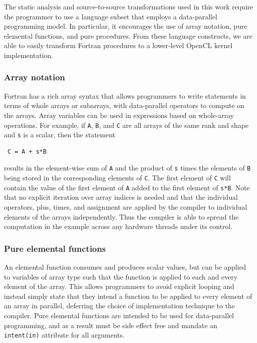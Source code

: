 The static analysis and source-to-source transformations used in this work
require the programmer to use a language subset that employs a data-parallel
programming model.  In particular, it encourages the use of array notation,
pure elemental functions, and pure procedures.  From these language constructs, we
are able to easily transform Fortran procedures to a lower-level OpenCL kernel
implementation.

\subsubsection*{Array notation}

Fortran has a rich array syntax that allows programmers to write statements in
terms of whole arrays or subarrays, with data-parallel operators to compute on
the arrays.  Array variables can be used in expressions based on whole-array
operations.  For example, if {\tt A}, {\tt B}, and {\tt C} are all arrays of the
same rank and shape and {\tt s} is a scalar, then the statement

{\small
\begin{verbatim}
 C = A + s*B
\end{verbatim}
}

\noindent
results in the element-wise sum of {\tt A} and the product of {\tt s} times the
elements of {\tt B} being stored in the corresponding elements of {\tt C}. The
first element of {\tt C} will contain the value of the first element of {\tt A}
added to the first element of {\tt s*B}.  Note that no explicit iteration over
array indices is needed and that the individual operators, plus, times, and
assignment are applied by the compiler to individual elements of the arrays
independently.  Thus the compiler is able to spread the computation in the
example across any hardware threads under its control.

\subsubsection*{Pure elemental functions}

An elemental function consumes and produces scalar values, but can be applied to
variables of array type such that the function is applied to each and every
element of the array.  This allows programmers to avoid explicit looping and
instead simply state that they intend a function to be applied to every element
of an array in parallel, deferring the choice of implementation technique to the
compiler.  Pure elemental functions are intended to be used for data-parallel
programming, and as a result must be side effect free and mandate an {\tt
intent(in)} attribute for all arguments. 

